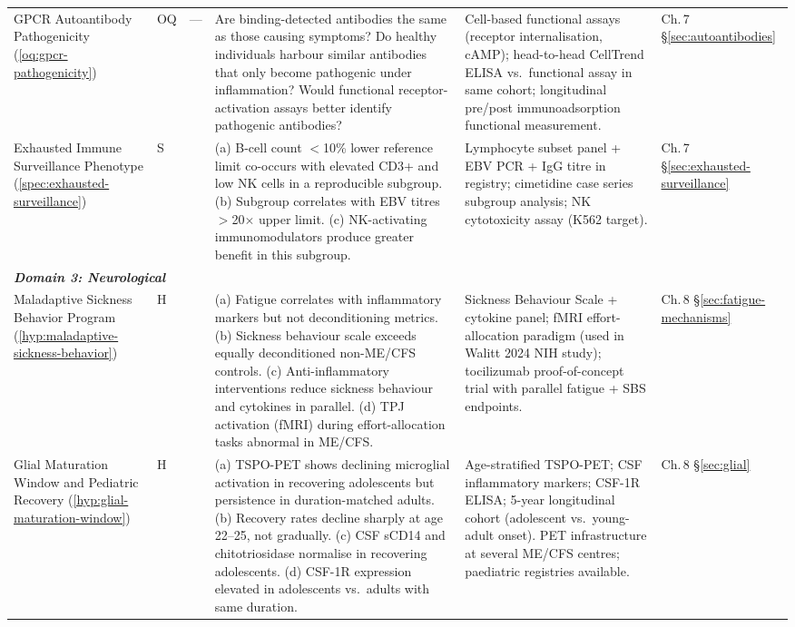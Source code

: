 \begin{longtable}{%
  p{3.0cm}
  >{\centering\arraybackslash}p{0.55cm}
  >{\centering\arraybackslash}p{1.0cm}
  p{3.8cm}
  p{3.8cm}
  p{2.2cm}
}
GPCR Autoantibody Pathogenicity
(\ref{oq:gpcr-pathogenicity})
&
OQ & ---
&
Are binding-detected antibodies the same as those causing symptoms?
Do healthy individuals harbour similar antibodies that only become pathogenic
under inflammation?
Would functional receptor-activation assays better identify pathogenic antibodies?
&
Cell-based functional assays (receptor internalisation, cAMP);
head-to-head CellTrend ELISA vs.\ functional assay in same cohort;
longitudinal pre/post immunoadsorption functional measurement.
&
Ch.\,7 \S\ref{sec:autoantibodies} \\[6pt]

Exhausted Immune Surveillance Phenotype
(\ref{spec:exhausted-surveillance})
&
S & 0.35
&
(a) B-cell count $<$10\% lower reference limit co-occurs with elevated CD3+
and low NK cells in a reproducible subgroup.
(b) Subgroup correlates with EBV titres $>$20$\times$ upper limit.
(c) NK-activating immunomodulators produce greater benefit in this subgroup.
&
Lymphocyte subset panel + EBV PCR + IgG titre in registry;
cimetidine case series subgroup analysis; NK cytotoxicity assay (K562 target).
&
Ch.\,7 \S\ref{sec:exhausted-surveillance} \\[6pt]

\multicolumn{6}{l}{\small\textit{\textbf{Domain 3: Neurological}}} \\[2pt]

Maladaptive Sickness Behavior Program
(\ref{hyp:maladaptive-sickness-behavior})
&
H & 0.50
&
(a) Fatigue correlates with inflammatory markers but not deconditioning metrics.
(b) Sickness behaviour scale exceeds equally deconditioned non-ME/CFS controls.
(c) Anti-inflammatory interventions reduce sickness behaviour and cytokines in
parallel.
(d) TPJ activation (fMRI) during effort-allocation tasks abnormal in ME/CFS.
&
Sickness Behaviour Scale + cytokine panel;
fMRI effort-allocation paradigm (used in Walitt 2024 NIH study);
tocilizumab proof-of-concept trial with parallel fatigue + SBS endpoints.
&
Ch.\,8 \S\ref{sec:fatigue-mechanisms} \\[6pt]

Glial Maturation Window and Pediatric Recovery
(\ref{hyp:glial-maturation-window})
&
H & 0.45
&
(a) TSPO-PET shows declining microglial activation in recovering adolescents
but persistence in duration-matched adults.
(b) Recovery rates decline sharply at age 22--25, not gradually.
(c) CSF sCD14 and chitotriosidase normalise in recovering adolescents.
(d) CSF-1R expression elevated in adolescents vs.\ adults with same duration.
&
Age-stratified TSPO-PET; CSF inflammatory markers; CSF-1R ELISA;
5-year longitudinal cohort (adolescent vs.\ young-adult onset).
PET infrastructure at several ME/CFS centres; paediatric registries available.
&
Ch.\,8 \S\ref{sec:glial} \\[6pt]


\end{longtable}
